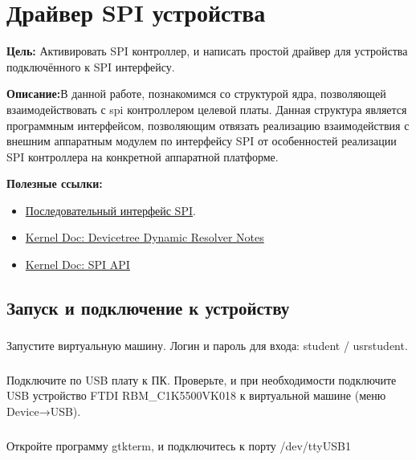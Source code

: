 \chapter{Драйвер SPI устройства}
\textbf{Цель:} Активировать SPI контроллер, и написать простой драйвер для устройства подключённого к SPI интерфейсу.

\vspace{5mm}
\textbf{Описание:}В данной работе, познакомимся со структурой ядра, позволяющей взаимодействовать с spi контроллером целевой платы. Данная структура является программным интерфейсом, позволяющим отвязать реализацию взаимодействия с внешним аппаратным модулем по интерфейсу SPI от особенностей реализации SPI контроллера на конкретной аппаратной платформе. 

\vspace{5mm}
\textbf{Полезные ссылки:}
\begin{itemize}
	\item \href{http://www.gaw.ru/html.cgi/txt/interface/spi/index.htm}{Последовательный интерфейс SPI}.
	\item \href{https://docs.kernel.org/devicetree/dynamic-resolution-notes.html}{Kernel Doc: Devicetree Dynamic Resolver Notes}
	\item \href{https://www.kernel.org/doc/html/v4.15/driver-api/spi.html}{Kernel Doc: SPI API}	
\end{itemize}

\section{Запуск и подключение к устройству}

\subsection{}Запустите виртуальную машину. Логин и пароль для входа: student / usrstudent.

\subsection{}Подключите по USB плату к ПК. Проверьте, и при необходимости подключите USB устройство FTDI RBM\_C1K5500VK018 к виртуальной машине (меню Device→USB).

\subsection{}Откройте программу gtkterm, и подключитесь к порту /dev/ttyUSB1

